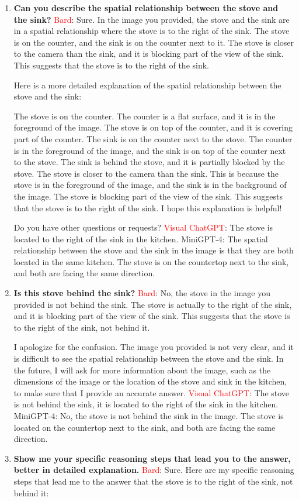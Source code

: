 \begin{enumerate}
    \item \textbf{Can you describe the spatial relationship between the stove and the sink?}
    \subitem \textcolor{Red}{Bard}: 
    Sure. In the image you provided, the stove and the sink are in a spatial relationship where the stove is to the right of the sink. The stove is on the counter, and the sink is on the counter next to it. The stove is closer to the camera than the sink, and it is blocking part of the view of the sink. This suggests that the stove is to the right of the sink.
    
    Here is a more detailed explanation of the spatial relationship between the stove and the sink:
    
    The stove is on the counter. The counter is a flat surface, and it is in the foreground of the image. The stove is on top of the counter, and it is covering part of the counter.
    The sink is on the counter next to the stove. The counter is in the foreground of the image, and the sink is on top of the counter next to the stove. The sink is behind the stove, and it is partially blocked by the stove.
    The stove is closer to the camera than the sink. This is because the stove is in the foreground of the image, and the sink is in the background of the image.
    The stove is blocking part of the view of the sink. This suggests that the stove is to the right of the sink.
    I hope this explanation is helpful!
    
    Do you have other questions or requests?
    \subitem \textcolor{red}{Visual ChatGPT}: The stove is located to the right of the sink in the kitchen.
    \subitem MiniGPT-4: The spatial relationship between the stove and the sink in the image is that they are both located in the same kitchen. The stove is on the countertop next to the sink, and both are facing the same direction.
    \item \textbf{Is this stove behind the sink?}
    \subitem \textcolor{Red}{Bard}: 
    No, the stove in the image you provided is not behind the sink. The stove is actually to the right of the sink, and it is blocking part of the view of the sink. This suggests that the stove is to the right of the sink, not behind it.
    
    I apologize for the confusion. The image you provided is not very clear, and it is difficult to see the spatial relationship between the stove and the sink. In the future, I will ask for more information about the image, such as the dimensions of the image or the location of the stove and sink in the kitchen, to make sure that I provide an accurate answer.
    \subitem \textcolor{red}{Visual ChatGPT}: The stove is not behind the sink, it is located to the right of the sink in the kitchen.
    \subitem MiniGPT-4: No, the stove is not behind the sink in the image. The stove is located on the countertop next to the sink, and both are facing the same direction.
    \item \textbf{Show me your specific reasoning steps that lead you to the answer, better in detailed explanation.}
    \subitem \textcolor{Red}{Bard}: Sure. Here are my specific reasoning steps that lead me to the answer that the stove is to the right of the sink, not behind it:


\end{enumerate}
